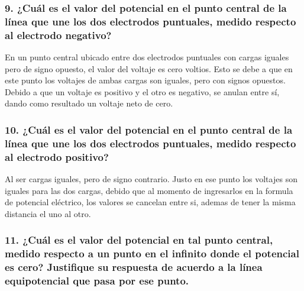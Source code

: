 \documentclass[letterpaper, 12pt]{report}
\begin{document}
\subsubsection{9. ¿Cuál es el valor del potencial en el punto central de la
	línea que une los dos electrodos puntuales, medido respecto al electrodo
	negativo?}

En un punto central ubicado entre dos electrodos puntuales
con cargas iguales pero de signo opuesto, el valor del
voltaje es cero voltios. Esto se debe a que en este punto
los voltajes de ambas cargas son iguales, pero con signos
opuestos. Debido a que un voltaje es positivo y el otro es
negativo, se anulan entre sí, dando como resultado un
voltaje neto de cero.

\subsubsection{10. ¿Cuál es el valor del potencial en el punto central de la
	línea que une los dos electrodos puntuales, medido respecto al electrodo
	positivo?}

Al ser cargas iguales, pero de signo contrario. Justo en
ese punto los voltajes son iguales para las dos cargas,
debido que al momento de ingresarlos en la formula de
potencial eléctrico, los valores se cancelan entre si,
ademas de tener la misma distancia el uno al otro.

\subsubsection{11. ¿Cuál es el valor del potencial en tal punto central, medido
	respecto a un punto en el infinito donde el potencial es cero? Justifique
	su respuesta de acuerdo a la línea equipotencial que pasa por ese punto.}
\end{document}
